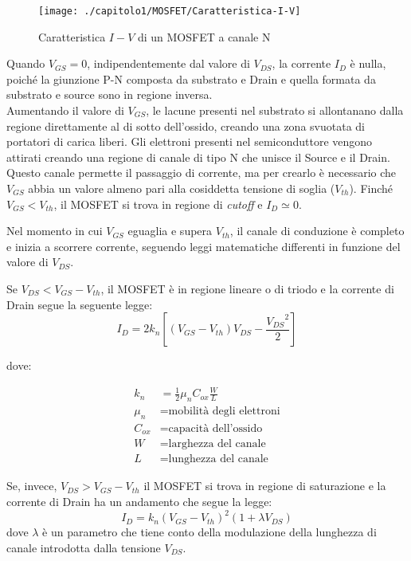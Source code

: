 \begin{figure}[h]
  \centering
  \texttt{[image: ./capitolo1/MOSFET/Caratteristica-I-V]}
  \caption[Caratteristica $I-V$ di un MOSFET a canale N]{Caratteristica $I-V$ di un MOSFET a canale N}
  \label{fig:caratteristica-I-V}
\end{figure}

Quando $V_{GS} = 0$, indipendentemente dal valore di $V_{DS}$, la corrente $I_D$ è nulla, poiché la giunzione P-N composta da substrato e Drain e quella formata da substrato e source sono in regione inversa. \\
Aumentando il valore di $V_{GS}$, le lacune presenti nel substrato si allontanano dalla regione direttamente al di sotto dell'ossido, creando una
zona svuotata di portatori di carica liberi. Gli elettroni presenti nel semiconduttore
vengono attirati creando una regione di canale di tipo N che unisce il
Source e il Drain. Questo canale permette il passaggio di corrente, ma per crearlo è necessario che $V_{GS}$ abbia un valore almeno pari alla cosiddetta tensione di soglia ($V_{th}$). Finché $V_{GS} < V_{th}$, il MOSFET si trova in regione di \emph{cutoff} e $I_D \simeq 0$.

Nel momento in cui $V_{GS}$ eguaglia e supera $V_{th}$, il canale di conduzione è completo e inizia a scorrere corrente, seguendo leggi matematiche differenti in funzione del valore di $V_{DS}$.

\vspace*{0.5cm}

Se $V_{DS} < V_{GS} -  V_{th}$, il MOSFET è in regione lineare o di triodo e la corrente di Drain segue la seguente legge:\\

\begin{equation}
  I_D = 2k_n\left[ \left(V_{GS}-V_{th}\right)V_{DS} - \frac{{V_{DS}}^2}{2}\right]
\end{equation}

dove:

\begin{align*}
   k_n &= \frac{1}{2}\mu_n C_{ox}\frac{W}{L} \\
   \mu_n &= \text{mobilità degli elettroni} \\
   C_{ox} &= \text{capacità dell'ossido} \\
   W &= \text{larghezza del canale} \\
   L &= \text{lunghezza del canale}
\end{align*}

Se, invece, $V_{DS} > V_{GS} -  V_{th}$ il MOSFET si trova in regione di saturazione e la corrente di Drain ha un andamento che segue la legge:\\
\begin{equation}
  I_D = k_n\left(V_{GS}-V_{th}\right)^2 (1+\lambda V_{DS})
\end{equation}
dove $\lambda$ è un parametro che tiene conto della modulazione della lunghezza di canale introdotta dalla tensione $V_{DS}$.\\

